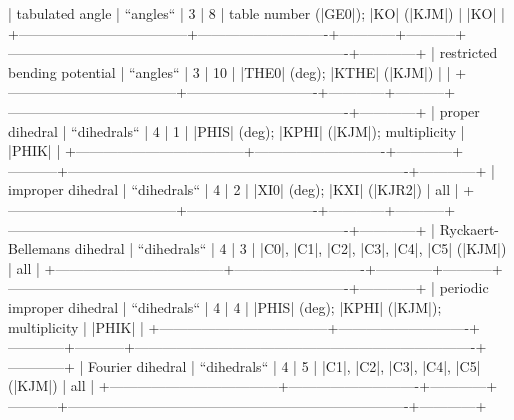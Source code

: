             | tabulated angle                    | ``angles``                 | 3          | 8         | table number (|GE0|); |KO| (|KJM|)                                      | |KO|       | 
            +------------------------------------+----------------------------+------------+-----------+-------------------------------------------------------------------------+------------+
            | restricted bending potential       | ``angles``                 | 3          | 10        | |THE0| (deg); |KTHE| (|KJM|)                                            |            | 
            +------------------------------------+----------------------------+------------+-----------+-------------------------------------------------------------------------+------------+
            | proper dihedral                    | ``dihedrals``              | 4          | 1         | |PHIS| (deg); |KPHI| (|KJM|); multiplicity                              | |PHIK|     | 
            +------------------------------------+----------------------------+------------+-----------+-------------------------------------------------------------------------+------------+
            | improper dihedral                  | ``dihedrals``              | 4          | 2         | |XI0| (deg); |KXI| (|KJR2|)                                             | all        | 
            +------------------------------------+----------------------------+------------+-----------+-------------------------------------------------------------------------+------------+
            | Ryckaert-Bellemans dihedral        | ``dihedrals``              | 4          | 3         | |C0|, |C1|, |C2|, |C3|, |C4|, |C5| (|KJM|)                              | all        | 
            +------------------------------------+----------------------------+------------+-----------+-------------------------------------------------------------------------+------------+
            | periodic improper dihedral         | ``dihedrals``              | 4          | 4         | |PHIS| (deg); |KPHI| (|KJM|); multiplicity                              | |PHIK|     | 
            +------------------------------------+----------------------------+------------+-----------+-------------------------------------------------------------------------+------------+
            | Fourier dihedral                   | ``dihedrals``              | 4          | 5         | |C1|, |C2|, |C3|, |C4|, |C5| (|KJM|)                                    | all        | 
            +------------------------------------+----------------------------+------------+-----------+-------------------------------------------------------------------------+------------+
